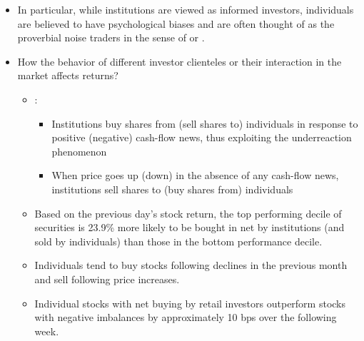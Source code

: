 \documentclass{beamer}
\begin{document}
\begin{frame}
	\begin{itemize}\tiny
		\item In particular, while institutions are viewed as informed
		investors, individuals are believed to have psychological biases and are often
		thought of as the proverbial noise traders in the sense of \cite{kyle1985continuous} or \cite{black1986noise}.
		\item How the
		behavior of different investor clienteles or their interaction in the market affects
		returns?
		\begin{itemize}\tiny
			\item \cite{cohen2002underreacts}:
			\begin{itemize}\tiny
				\item Institutions buy shares from (sell
				shares to) individuals in response to positive (negative) cash-flow news, thus exploiting the
				underreaction phenomenon
				\item When price goes up (down) in the absence of any cash-flow news, institutions sell shares to
				(buy shares from) individuals
			\end{itemize}
			\item Based on the previous day’s stock return, the top performing decile
			of securities is 23.9\% more likely to be bought in net by institutions (and sold
			by individuals) than those in the bottom performance decile. \cite{griffin2003dynamics}
			\item  Individuals tend to buy stocks following declines in the previous month
			and sell following price increases. \cite{kaniel2008individual}
\item  Individual stocks with net buying by retail investors outperform stocks with negative imbalances by approximately 10 bps over the following week. \cite{BOEHMER2021}
			
		\end{itemize}
	
	\end{itemize}
\end{frame}
\end{document}
